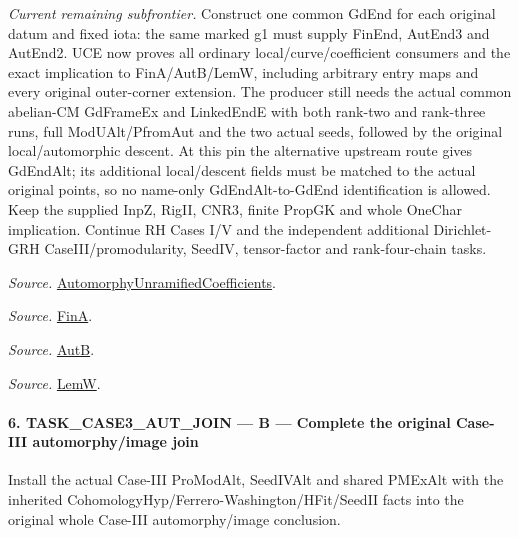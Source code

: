 \documentclass[11pt,a4paper]{article}
\numberwithin{equation}{section}
\theoremstyle{remark}\newtheorem{remark}[theorem]{Remark}
\begin{document}
\emph{Current remaining subfrontier.} Construct one common GdEnd for each original datum and fixed iota: the same marked g1 must supply FinEnd, AutEnd3 and AutEnd2. UCE now proves all ordinary local/curve/coefficient consumers and the exact implication to FinA/AutB/LemW, including arbitrary entry maps and every original outer-corner extension. The producer still needs the actual common abelian-CM GdFrameEx and LinkedEndE with both rank-two and rank-three runs, full ModUAlt/PfromAut and the two actual seeds, followed by the original local/automorphic descent. At this pin the alternative upstream route gives GdEndAlt; its additional local/descent fields must be matched to the actual original points, so no name-only GdEndAlt-to-GdEnd identification is allowed. Keep the supplied InpZ, RigII, CNR3, finite PropGK and whole OneChar implication. Continue RH Cases I/V and the independent additional Dirichlet-GRH CaseIII/promodularity, SeedIV, tensor-factor and rank-four-chain tasks.

\emph{Source.} \href{https://github.com/CocoSgt/riemann-hypothesis-lean/blob/7cbf7a0c32fca1badf05931879a37c3f8a2b03b4/src/Development/AutomorphicArithmetic/AutomorphicVarieties/AutomorphicCases/AutomorphyUnramifiedCoefficients.lean#L24-L27}{AutomorphyUnramifiedCoefficients}.

\emph{Source.} \href{https://github.com/CocoSgt/riemann-hypothesis-lean/blob/7cbf7a0c32fca1badf05931879a37c3f8a2b03b4/src/Development/AutomorphicArithmetic/AutomorphicVarieties/AutomorphicCases/AutomorphyUnramifiedCoefficients.lean#L12-L13}{FinA}.

\emph{Source.} \href{https://github.com/CocoSgt/riemann-hypothesis-lean/blob/7cbf7a0c32fca1badf05931879a37c3f8a2b03b4/src/Development/AutomorphicArithmetic/AutomorphicVarieties/AutomorphicCases/AutomorphyUnramifiedCoefficients.lean#L15-L17}{AutB}.

\emph{Source.} \href{https://github.com/CocoSgt/riemann-hypothesis-lean/blob/7cbf7a0c32fca1badf05931879a37c3f8a2b03b4/src/Development/AutomorphicArithmetic/AutomorphicVarieties/AutomorphicCases/AutomorphyUnramifiedCoefficients.lean#L19-L22}{LemW}.



\paragraph{6. TASK\_\allowbreak CASE3\_\allowbreak AUT\_\allowbreak JOIN — B — Complete the original Case-III automorphy/image join}

Install the actual Case-III ProModAlt, SeedIVAlt and shared PMExAlt with the inherited CohomologyHyp/Ferrero-Washington/HFit/SeedII facts into the original whole Case-III automorphy/image conclusion.
\end{document}

